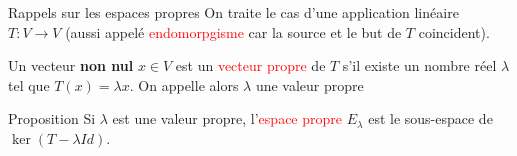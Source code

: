 \begin{parag}{Rappels sur les espaces propres}
On traite le cas d'une application linéaire $T : V \to V$ (aussi appelé \textcolor{red}{endomorpgisme} car la source et le but de $T$ coincident).
\begin{definition}
    Un vecteur \textbf{non nul} $x \in V$ est un \textcolor{red}{vecteur propre} de $T$ s'il existe un nombre réel $\lambda$ tel que $T(x) = \lambda x$. On appelle alors $\lambda$ une valeur propre  
\end{definition}
\end{parag}
\begin{parag}{Proposition}
    Si $\lambda$ est une valeur propre, l'\textcolor{red}{espace propre} $E_\lambda$ est le sous-espace de $\ker(T - \lambda Id)$.
    
\end{parag}

